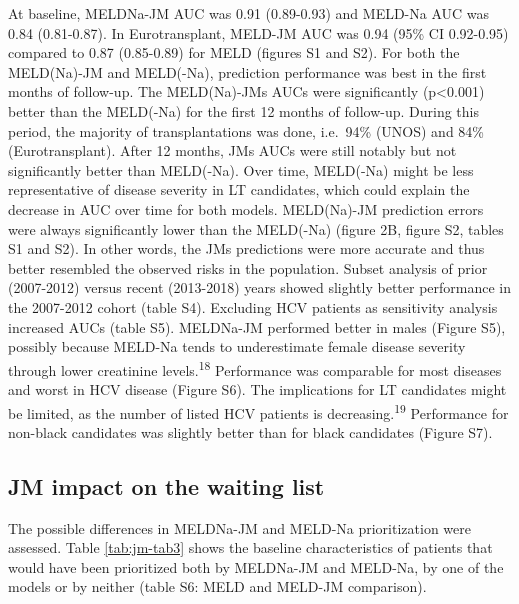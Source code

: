\documentclass[11pt,english,]{book} %
\begin{document}
At baseline, MELDNa-JM AUC was 0.91 (0.89-0.93) and MELD-Na AUC was 0.84 (0.81-0.87). In Eurotransplant, MELD-JM AUC was 0.94 (95\% CI 0.92-0.95) compared to 0.87 (0.85-0.89) for MELD (figures S1 and S2). For both the MELD(Na)-JM and MELD(-Na), prediction performance was best in the first months of follow-up. The MELD(Na)-JMs AUCs were significantly (p\textless0.001) better than the MELD(-Na) for the first 12 months of follow-up. During this period, the majority of transplantations was done, i.e.~94\% (UNOS) and 84\% (Eurotransplant). After 12 months, JMs AUCs were still notably but not significantly better than MELD(-Na). Over time, MELD(-Na) might be less representative of disease severity in LT candidates, which could explain the decrease in AUC over time for both models. MELD(Na)-JM prediction errors were always significantly lower than the MELD(-Na) (figure 2B, figure S2, tables S1 and S2). In other words, the JMs predictions were more accurate and thus better resembled the observed risks in the population. Subset analysis of prior (2007-2012) versus recent (2013-2018) years showed slightly better performance in the 2007-2012 cohort (table S4). Excluding HCV patients as sensitivity analysis increased AUCs (table S5). MELDNa-JM performed better in males (Figure S5), possibly because MELD-Na tends to underestimate female disease severity through lower creatinine levels.\textsuperscript{18} Performance was comparable for most diseases and worst in HCV disease (Figure S6). The implications for LT candidates might be limited, as the number of listed HCV patients is decreasing.\textsuperscript{19} Performance for non-black candidates was slightly better than for black candidates (Figure S7).

\hypertarget{jm-impact-on-the-waiting-list}{%
\subsection*{JM impact on the waiting list}\label{jm-impact-on-the-waiting-list}}

The possible differences in MELDNa-JM and MELD-Na prioritization were assessed. Table \ref{tab:jm-tab3} shows the baseline characteristics of patients that would have been prioritized both by MELDNa-JM and MELD-Na, by one of the models or by neither (table S6: MELD and MELD-JM comparison).
\end{document}
